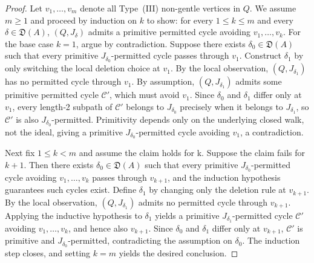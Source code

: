 \documentclass[11pt]{amsart}
\numberwithin{equation}{section}
\theoremstyle{definition}
\begin{document}
\begin{proof}
Let \(v_1,\ldots,v_m\) denote all Type~\textup{(III)} non-gentle vertices in \(Q\). We assume \(m\geq1\) and proceed by induction on \(k\) to show: for every \(1\leq k\leq m\) and every \(\delta\in\mathfrak D(A)\), \((Q,J_\delta)\) admits a primitive permitted cycle avoiding \(v_1,\ldots,v_k\).
For the base case \(k=1\), argue by contradiction. Suppose there exists \(\delta_0\in\mathfrak D(A)\) such that every primitive \(J_{\delta_0}\)-permitted cycle passes through \(v_1\). Construct \(\delta_1\) by only switching the local deletion choice at \(v_1\). By the local observation, \((Q,J_{\delta_1})\) has no permitted cycle through \(v_1\). By assumption, \((Q,J_{\delta_1})\) admits some primitive permitted cycle \(\mathcal C'\), which must avoid \(v_1\). Since \(\delta_0\) and \(\delta_1\) differ only at \(v_1\), every length‑2 subpath of \(\mathcal C'\) belongs to \(J_{\delta_0}\) precisely when it belongs to \(J_{\delta_1}\), so \(\mathcal C'\) is also \(J_{\delta_0}\)-permitted. Primitivity depends only on the underlying closed walk, not the ideal, giving a primitive \(J_{\delta_0}\)-permitted cycle avoiding \(v_1\), a contradiction.

Next fix \(1\leq k<m\) and assume the claim holds for k. Suppose the claim fails for \(k+1\). Then there exists \(\delta_0\in\mathfrak D(A)\) such that every primitive \(J_{\delta_0}\)-permitted cycle avoiding \(v_1,\dots,v_k\) passes through \(v_{k+1}\), and the induction hypothesis guarantees such cycles exist. Define \(\delta_1\) by changing only the deletion rule at \(v_{k+1}\). By the local observation, \((Q,J_{\delta_1})\) admits no permitted cycle through \(v_{k+1}\). Applying the inductive hypothesis to \(\delta_1\) yields a primitive \(J_{\delta_1}\)-permitted cycle \(\mathcal C'\) avoiding \(v_1,\dots,v_k\), and hence also \(v_{k+1}\). Since \(\delta_0\) and \(\delta_1\) differ only at \(v_{k+1}\), \(\mathcal C'\) is primitive and \(J_{\delta_0}\)-permitted, contradicting the assumption on \(\delta_0\).
The induction step closes, and setting \(k=m\) yields the desired conclusion.
\end{proof}
\end{document}
